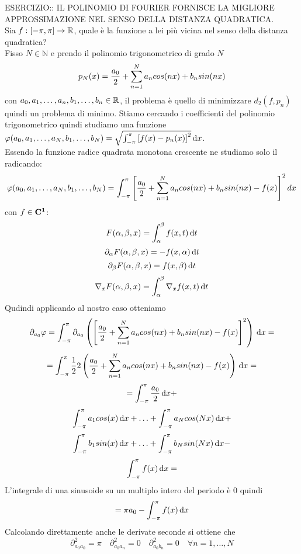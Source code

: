 ESERCIZIO:: IL POLINOMIO DI FOURIER FORNISCE LA MIGLIORE APPROSSIMAZIONE NEL SENSO DELLA DISTANZA QUADRATICA.\\
Sia $f:\left[-\pi,\pi\right]\to \mathbb{R}$, quale è la funzione a lei più vicina nel senso della distanza quadratica?\\
Fisso $N\in\mathbb{N}$ e prendo il polinomio trigonometrico di grado $N$
$$p_N(x)=\frac{a_0}{2}+\sum\limits_{n=1}^{N}a_{n}cos(nx)+b_{n}sin(nx)$$
con $a_0,a_1,\ldots,a_n,b_1,\ldots,b_n\in \mathbb{R}$, il problema è quello di minimizzare $d_2(f,p_n)$ quindi un problema di minimo. Stiamo cercando i coefficienti del polinomio trigonometrico quindi studiamo una funzione $\varphi(a_0,a_1,\ldots,a_N,b_1,\ldots,b_N) = \sqrt{\int_{-\pi}^{\pi}\left[f(x)-p_n(x)\right]^2}\,\mathrm{d}{x}$.\\
Essendo la funzione radice quadrata monotona crescente ne studiamo solo il radicando:
$$\varphi(a_0,a_1,\ldots,a_N,b_1,\ldots,b_N)=\int_{-\pi}^{\pi}\left[\frac{a_0}{2}+\sum\limits_{n=1}^{N}a_{n}cos(nx)+b_{n}sin(nx)-f(x)\right]^2dx$$
\observation
con $f\in \mathbf{C^{1}}$:
$$F(\alpha,\beta,x)=\int_{\alpha}^{\beta}f(x,t)\,\mathrm{d}{t}$$
$$\partial_\alpha F(\alpha,\beta,x)=-f(x,\alpha)\,\mathrm{d}{t}$$
$$\partial_\beta F(\alpha,\beta,x)=f(x,\beta)\,\mathrm{d}{t}$$
$$\nabla_x F(\alpha,\beta,x)=\int_{\alpha}^{\beta}\nabla_xf(x,t)\,\mathrm{d}{t}$$
Qudindi applicando al nostro caso otteniamo
$$\partial_{a_0}\varphi = \int_{-\pi}^{\pi}\partial_{a_0}\left(\left[\frac{a_0}{2}+\sum\limits_{n=1}^{N}a_{n}cos(nx)+b_{n}sin(nx)-f(x)\right]^2\right)\,\mathrm{d}{x}=$$
$$ = \int_{-\pi}^{\pi} \frac{1}{2}2\left(\frac{a_0}{2}+\sum\limits_{n=1}^{N}a_{n}cos(nx)+b_{n}sin(nx)-f(x)\right)\,\mathrm{d}{x}=$$
$$ =  \int_{-\pi}^{\pi} \frac{a_0}{2}\,\mathrm{d}{x} + $$
$$\int_{-\pi}^{\pi} a_1cos(x)\,\mathrm{d}{x} +
\ldots + 
\int_{-\pi}^{\pi} a_Ncos(Nx)\,\mathrm{d}{x} + $$
$$\int_{-\pi}^{\pi} b_1sin(x)\,\mathrm{d}{x} +
\ldots + 
\int_{-\pi}^{\pi} b_Nsin(Nx)\,\mathrm{d}{x} - $$
$$ \int_{-\pi}^{\pi} f(x)\,\mathrm{d}{x} = $$
L'integrale di una sinusoide su un multiplo intero del periodo è $0$ quindi
$$=\pi a_0-\int_{-\pi}^{\pi}f(x)\,\mathrm{d}{x}$$
Calcolando direttamente anche le derivate seconde si ottiene che
$$\partial^2_{a_0a_0}=\pi\quad\partial^2_{a_0a_n}=0\quad\partial^2_{a_0b_n}=0\quad\forall n=1,\ldots,N$$

